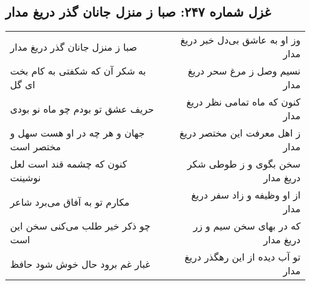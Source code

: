 \begin{center}
\section*{غزل شماره ۲۴۷: صبا ز منزل جانان گذر دریغ مدار}
\label{sec:sh247}
\begin{longtable}{l p{0.5cm} r}
صبا ز منزل جانان گذر دریغ مدار
&&
وز او به عاشق بی‌دل خبر دریغ مدار
\\
به شکر آن که شکفتی به کام بخت ای گل
&&
نسیم وصل ز مرغ سحر دریغ مدار
\\
حریف عشق تو بودم چو ماه نو بودی
&&
کنون که ماه تمامی نظر دریغ مدار
\\
جهان و هر چه در او هست سهل و مختصر است
&&
ز اهل معرفت این مختصر دریغ مدار
\\
کنون که چشمه قند است لعل نوشینت
&&
سخن بگوی و ز طوطی شکر دریغ مدار
\\
مکارم تو به آفاق می‌برد شاعر
&&
از او وظیفه و زاد سفر دریغ مدار
\\
چو ذکر خیر طلب می‌کنی سخن این است
&&
که در بهای سخن سیم و زر دریغ مدار
\\
غبار غم برود حال خوش شود حافظ
&&
تو آب دیده از این رهگذر دریغ مدار
\\
\end{longtable}
\end{center}

